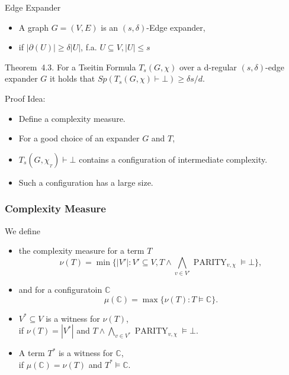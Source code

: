 \documentclass[t,usenames,dvipsnames]{beamer}
\begin{document}
\begin{frame}{Edge Expander}
	\begin{itemize}
		\item A graph $G = (V, E)$ is an $(s, \delta)$-Edge expander,
		\item[]\hspace{1cm} if $|\partial(U)| \geq \delta|U|$,  f.a. $U \subseteq V, |U| \leq s$
	\end{itemize}
	\pause
	\begin{block}{Theorem~4.3.}
		For a Tseitin Formula $T_s(G, \chi)$ over a d-regular $(s, \delta)$-edge expander
		$G$ it holds that $Sp(T_s(G, \chi)\vdash \bot) \geq \delta s / d$.
	\end{block}
	\pause
	Proof Idea:
	\begin{itemize}[<+->]
		\item Define a complexity measure.
		\item For a good choice of an expander $G$ and $T$,
		\item $T_s(G,\chi_{_T}) \vdash \bot$ contains a configuration of intermediate
			complexity.
		\item Such a configuration has a large size.
	\end{itemize}
\end{frame}

\begin{frame} \frametitle{Complexity Measure}
	We define 
	\pause
	\begin{itemize}[<+->]
		\item the complexity measure for a term $T$
		$$\nu(T) =\min\{|V'|\colon V'\subseteq V, T \land \bigwedge_{v \in V'}
			\operatorname{PARITY}_{v, \chi} \models \bot\},$$
		\item and for a configuratoin $\mathbb{C}$
		$$\mu(\mathbb{C}) =\max\{\nu(T)\colon T \models \mathbb{C}\}.$$
		\item $V^* \subseteq V$ is a {\color{red}witness} for $\nu(T)$,\\
			\hspace{1cm} if $\nu(T) = |V^*|$ and $T \land \bigwedge_{v \in
			V^*}\operatorname{PARITY}_{v, \chi} \models \bot$.
		\item A term $T^*$ is a {\color{red}witness} for $\mathbb{C}$,\\
			\hspace{1cm} if $\mu(\mathbb{C}) = \nu(T)$ and $T^* \models \mathbb{C}$.
	\end{itemize}
\end{frame}
\end{document}
